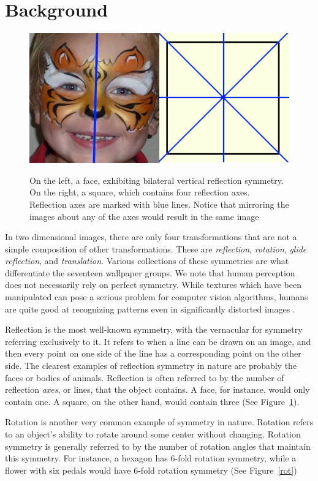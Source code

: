 \section{Background}
\begin{figure}
\centering
\includegraphics[width=0.9\columnwidth]{reflection}
\label{ref}
\caption{On the left, a face, exhibiting bilateral vertical reflection symmetry. On the right, a square, which contains four reflection axes. Reflection axes are marked with blue lines. Notice that mirroring the images about any of the axes would result in the same image}
\end{figure}

In two dimensional images, there are only four transformations that are not a simple composition of other transformations. These are \textit{reflection}, \textit{rotation}, \textit{glide reflection}, and \textit{translation}. Various collections of these symmetries are what differentiate the seventeen wallpaper groups. We note that human perception does not necessarily rely on perfect symmetry. While textures which have been manipulated can pose a serious problem for computer vision algorithms, humans are quite good at recognizing patterns even in significantly distorted images \cite{nearregular}.  

Reflection is the most well-known symmetry, with the vernacular for symmetry referring exclusively to it. It refers to when a line can be drawn on an image, and then every point on one side of the line has a corresponding point on the other side. The clearest examples of reflection symmetry in nature are probably the faces or bodies of animals. Reflection is often referred to by the number of reflection \textit{axes}, or lines, that the object contains. A face, for instance, would only contain one. A square, on the other hand, would contain three (See Figure~\ref{ref}).

Rotation is another very common example of symmetry in nature. Rotation refers to an object's ability to rotate around some center without changing. Rotation symmetry is generally referred to by the number of rotation angles that maintain this symmetry. For instance, a hexagon has 6-fold rotation symmetry, while a flower with six pedals would have 6-fold rotation symmetry (See Figure~\ref{rot})


